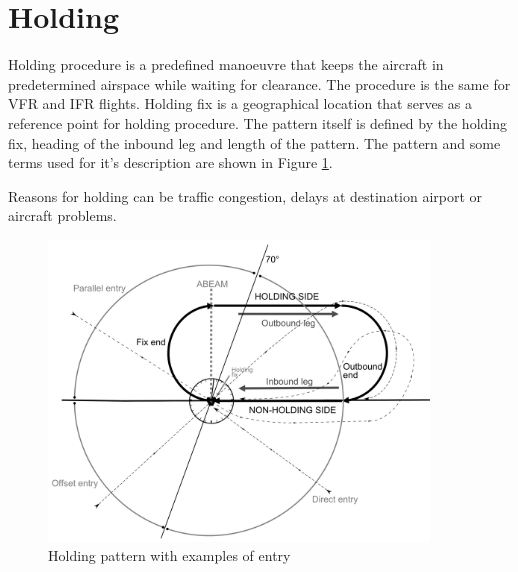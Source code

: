
\section{Holding}

Holding procedure is a predefined manoeuvre that keeps the aircraft in predetermined airspace while waiting for clearance. The procedure is the same for VFR and IFR flights. Holding fix is a geographical location that serves as a reference point for holding procedure. The pattern itself is defined by the holding fix, heading of the inbound leg and length of the pattern. \cite[Chapter 6]{doc4444} The pattern and some terms used for it's description are shown in Figure \ref{fig:holding}.

Reasons for holding can be traffic congestion, delays at destination airport or aircraft problems.


\begin{figure}[h]
    \centering
    \includegraphics[width=0.9\textwidth]{figures/holding.png}
    \caption{Holding pattern with examples of entry}
    \label{fig:holding}
\end{figure}


